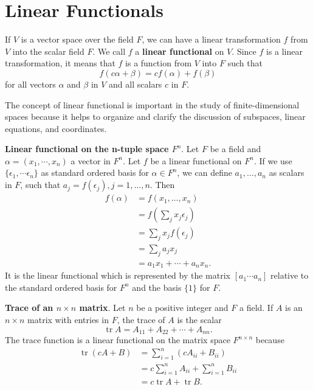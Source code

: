\documentclass[main.tex]{subfiles}
\begin{document}
\section{Linear Functionals}
\begin{definition}
If $V$ is a vector space over the field $F$, we can have a linear transformation $f$ from $V$ into the scalar field $F$. We call $f$ a \textbf{linear functional} on $V$. Since $f$ is a linear transformation, it means that $f$ is a function from $V$ into $F$ such that
$$
f(c \alpha+\beta)=c f(\alpha)+f(\beta)
$$
for all vectors $\alpha$ and $\beta$ in $V$ and all scalars $c$ in $F$. 
\end{definition}
The concept of linear functional is important in the study of finite-dimensional spaces because it helps to organize and clarify the discussion of subspaces, linear equations, and coordinates.

\begin{example}
\textbf{Linear functional on the n-tuple space $F^n$}. Let $F$ be a field and $\alpha = (x_1, \cdots, x_n)$ a vector in $F^n$. Let $f$ be a linear functional on $F^n$. If we use $\{ \epsilon_1, \cdots \epsilon_n\}$ as standard ordered basis for $\alpha \in F^n$, we can define $a_1, \ldots, a_n$ as scalars in $F$, such that $a_j = f(\epsilon_j), j=1, \ldots, n .$ Then  
$$
\begin{aligned}
f(\alpha)
& =f\left(x_1, \ldots, x_n\right) \\
& =f\left(\sum_j x_j \epsilon_j\right) \\
& =\sum_j x_j f\left(\epsilon_j\right) \\
& =\sum_j a_j x_j \\
& =a_1 x_1+\cdots+a_n x_n.
\end{aligned}
$$
It is the linear functional which is represented by the matrix $\left[a_1 \cdots a_n\right]$ relative to the standard ordered basis for $F^n$ and the basis $\{1\}$ for $F$.
\end{example}


\begin{example}
\textbf{Trace of an $n \times n$ matrix}. Let $n$ be a positive integer and $F$ a field. If $A$ is an $n \times n$ matrix with entries in $F$, the trace of $A$ is the scalar
$$
\operatorname{tr} A=A_{11}+A_{22}+\cdots+A_{n n} .
$$
The trace function is a linear functional on the matrix space $F^{n \times n}$ because
$$
\begin{aligned}
\operatorname{tr}(c A+B) & =\sum_{i=1}^n\left(c A_{i i}+B_{i i}\right) \\
& =c \sum_{i=1}^n A_{i i}+\sum_{i=1}^n B_{i i} \\
& =c \operatorname{tr} A+\operatorname{tr} B .
\end{aligned}
$$
\end{example}
\end{document}
